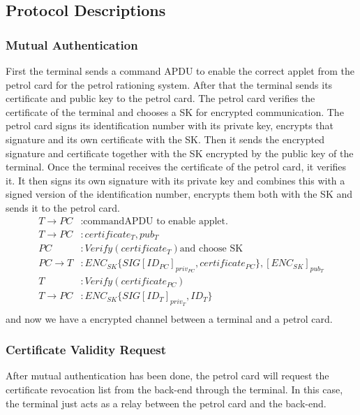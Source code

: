 \subsection{Protocol Descriptions}



\subsubsection{Mutual Authentication}
First the terminal sends a command APDU to enable the correct applet from the petrol card for the petrol rationing system. After that the terminal sends its certificate and public key to the petrol card. The petrol card verifies the certificate of the terminal and chooses a SK for encrypted communication. The petrol card signs its identification number with its private key, encrypts that signature and its own certificate with the SK. Then it sends the encrypted signature and certificate together with the SK encrypted by the public key of the terminal. Once the terminal receives the certificate of the petrol card, it verifies it. It then signs its own signature with its private key and combines this with a signed version of the identification number, encrypts them both with the SK and sends it to the petrol card.
\\

\begin{equation}\nonumber
\begin{split} 
T \to PC &: \text{commandAPDU to enable applet.}\\
T \to PC &: certificate_{T}, pub_{T}\\ 
PC &: Verify(certificate_{T}) \text{and choose SK}\\
PC \to T &: ENC_{SK}\{SIG[ID_{PC}]_{priv_{PC}}, certificate_{PC}\},  [ENC_{SK}]_{pub_T}\\
T&: Verify(certificate_{PC})\\
T \to PC &: ENC_{SK}\{SIG[ID_{T}]_{priv_T}, ID_{T}\} \\ 
\end{split} 
\end{equation}
and now we have a encrypted channel between a terminal and a petrol card.

\subsubsection{Certificate Validity Request}
After mutual authentication has been done, the petrol card will request the certificate revocation list from the back-end through the terminal. In this case, the terminal just acts as a relay between the petrol card and the back-end.

